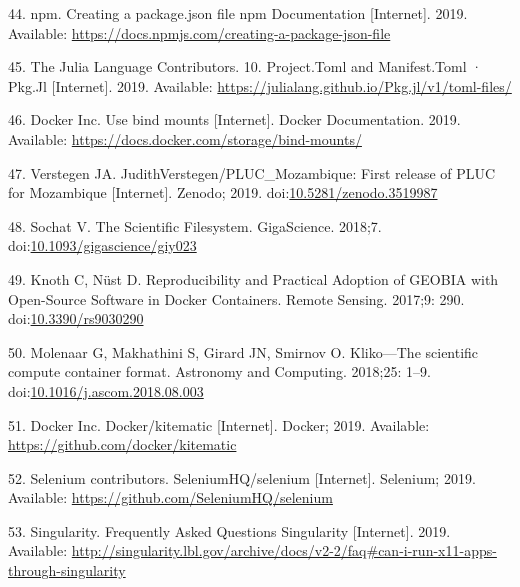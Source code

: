\documentclass[10pt,letterpaper]{article}
\begin{document}
\leavevmode\hypertarget{ref-npm_creating_2019}{}%
44. npm. Creating a package.json file npm Documentation {[}Internet{]}.
2019. Available:
\url{https://docs.npmjs.com/creating-a-package-json-file}

\leavevmode\hypertarget{ref-julia_tomls_2019}{}%
45. The Julia Language Contributors. 10. Project.Toml and Manifest.Toml
· Pkg.Jl {[}Internet{]}. 2019. Available:
\url{https://julialang.github.io/Pkg.jl/v1/toml-files/}

\leavevmode\hypertarget{ref-docker_use_2019}{}%
46. Docker Inc. Use bind mounts {[}Internet{]}. Docker Documentation.
2019. Available: \url{https://docs.docker.com/storage/bind-mounts/}

\leavevmode\hypertarget{ref-verstegen_pluc_mozambique_2019}{}%
47. Verstegen JA. JudithVerstegen/PLUC\_Mozambique: First release of
PLUC for Mozambique {[}Internet{]}. Zenodo; 2019.
doi:\href{https://doi.org/10.5281/zenodo.3519987}{10.5281/zenodo.3519987}

\leavevmode\hypertarget{ref-sochat_scientific_2018}{}%
48. Sochat V. The Scientific Filesystem. GigaScience. 2018;7.
doi:\href{https://doi.org/10.1093/gigascience/giy023}{10.1093/gigascience/giy023}

\leavevmode\hypertarget{ref-knoth_reproducibility_2017}{}%
49. Knoth C, Nüst D. Reproducibility and Practical Adoption of GEOBIA
with Open-Source Software in Docker Containers. Remote Sensing. 2017;9:
290. doi:\href{https://doi.org/10.3390/rs9030290}{10.3390/rs9030290}

\leavevmode\hypertarget{ref-molenaar_klikoscientific_2018}{}%
50. Molenaar G, Makhathini S, Girard JN, Smirnov O. Kliko---The
scientific compute container format. Astronomy and Computing. 2018;25:
1--9.
doi:\href{https://doi.org/10.1016/j.ascom.2018.08.003}{10.1016/j.ascom.2018.08.003}

\leavevmode\hypertarget{ref-docker_kitematic_2019}{}%
51. Docker Inc. Docker/kitematic {[}Internet{]}. Docker; 2019.
Available: \url{https://github.com/docker/kitematic}

\leavevmode\hypertarget{ref-selenium_2019}{}%
52. Selenium contributors. SeleniumHQ/selenium {[}Internet{]}. Selenium;
2019. Available: \url{https://github.com/SeleniumHQ/selenium}

\leavevmode\hypertarget{ref-singularity_frequently_2019}{}%
53. Singularity. Frequently Asked Questions Singularity {[}Internet{]}.
2019. Available:
\url{http://singularity.lbl.gov/archive/docs/v2-2/faq\#can-i-run-x11-apps-through-singularity}
\end{document}
